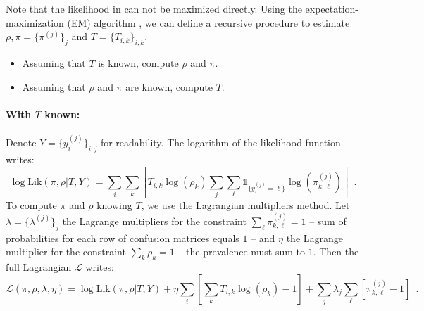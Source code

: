 Note that the likelihood in  can not be maximized directly.
Using the expectation-maximization (EM) algorithm \citep{Dempster_Laird_Rubin77}, we can define a recursive procedure to estimate $\rho,\pi=\{\pi^{(j)}\}_j$ and $T=\{T_{i,k}\}_{i,k}$.
\begin{itemize}
    \item Assuming that $T$ is known, compute $\rho$ and $\pi$.
    \item Assuming that $\rho$ and $\pi$ are known, compute $T$.
\end{itemize}

\paragraph{With $T$ known: }
Denote $Y=\{y_i^{(j)}\}_{i,j}$ for readability.
The logarithm of the likelihood function writes:
\begin{equation*}
    \log \text{Lik}(\pi,\rho|T, Y) = \sum_{i} \sum_{k} \left[T_{i,k} \log (\rho_k) \sum_j \sum_\ell \mathds{1}_{\{y_i^{(j)}=\ell\}}\log(\pi^{(j)}_{k,\ell})\right] \enspace.
\end{equation*}
To compute $\pi$ and $\rho$ knowing $T$, we use the Lagrangian multipliers method. Let $\lambda=\{\lambda^{(j)}\}_{j}$ the Lagrange multipliers for the constraint $\sum_\ell \pi_{k,\ell}^{(j)}=1$ -- sum of probabilities for each row of confusion matrices equals $1$ -- and $\eta$ the Lagrange multiplier for the constraint $\sum_k \rho_k=1$ -- the prevalence must sum to $1$. Then the full Lagrangian $\mathcal{L}$ writes:
\begin{equation*}
        \mathcal{L}(\pi,\rho,\lambda,\eta) = \log \text{Lik}(\pi,\rho|T, Y)  + \eta\sum_i \left[\sum_k T_{i,k} \log(\rho_k) - 1\right]
        + \sum_j \lambda_{j}\sum_\ell\left[\pi^{(j)}_{k,\ell} - 1\right]
        \enspace.
\end{equation*}

